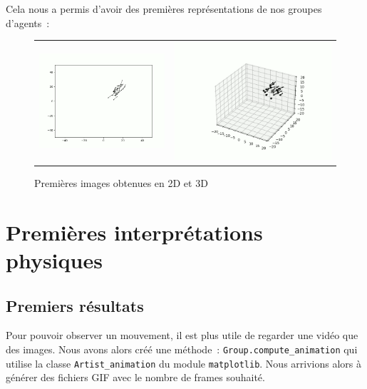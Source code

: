 \documentclass[french, a4paper, 12pt, openany]{report}
\begin{document}
	Cela nous a permis d'avoir des premières représentations de nos groupes d'agents~:
	\begin{figure}[!h]
		\centering
		\begin{tabular}{cc}
			\includegraphics[width=8cm]{images/image_2.png} & \includegraphics[width=10cm]{images/image_1.png} \\
		\end{tabular}
		\caption{Premières images obtenues en 2D et 3D }
	\end{figure} \newpage

\chapter{Premières interprétations physiques}
\section{Premiers résultats}

   Pour pouvoir observer un mouvement, il est plus utile de regarder une vidéo que des images. Nous avons alors créé une méthode~: \verb|Group.compute_animation| qui utilise la classe \verb|Artist_animation| du module \verb|matplotlib|. Nous arrivions alors à générer des fichiers GIF avec le nombre de frames souhaité.
   
\end{document}

